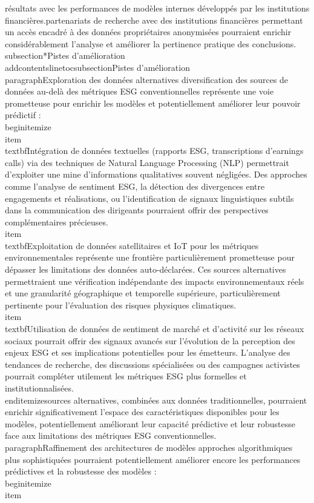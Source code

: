 résultats avec les performances de modèles internes développés par les institutions financières.\n\nDes partenariats de recherche avec des institutions financières permettant un accès encadré à des données propriétaires anonymisées pourraient enrichir considérablement l'analyse et améliorer la pertinence pratique des conclusions.\n\n\\subsection*{Pistes d'amélioration}\n\\addcontentsline{toc}{subsection}{Pistes d'amélioration}\n\n\\paragraph{Exploration des données alternatives} \n\nLa diversification des sources de données au-delà des métriques ESG conventionnelles représente une voie prometteuse pour enrichir les modèles et potentiellement améliorer leur pouvoir prédictif :\n\\begin{itemize}\n    \\item \\textbf{Intégration de données textuelles} (rapports ESG, transcriptions d'earnings calls) via des techniques de Natural Language Processing (NLP) permettrait d'exploiter une mine d'informations qualitatives souvent négligées. Des approches comme l'analyse de sentiment ESG, la détection des divergences entre engagements et réalisations, ou l'identification de signaux linguistiques subtils dans la communication des dirigeants pourraient offrir des perspectives complémentaires précieuses.\n    \n    \\item \\textbf{Exploitation de données satellitaires et IoT pour les métriques environnementales} représente une frontière particulièrement prometteuse pour dépasser les limitations des données auto-déclarées. Ces sources alternatives permettraient une vérification indépendante des impacts environnementaux réels et une granularité géographique et temporelle supérieure, particulièrement pertinente pour l'évaluation des risques physiques climatiques.\n    \n    \\item \\textbf{Utilisation de données de sentiment de marché et d'activité sur les réseaux sociaux} pourrait offrir des signaux avancés sur l'évolution de la perception des enjeux ESG et ses implications potentielles pour les émetteurs. L'analyse des tendances de recherche, des discussions spécialisées ou des campagnes activistes pourrait compléter utilement les métriques ESG plus formelles et institutionnalisées.\n\\end{itemize}\n\nCes sources alternatives, combinées aux données traditionnelles, pourraient enrichir significativement l'espace des caractéristiques disponibles pour les modèles, potentiellement améliorant leur capacité prédictive et leur robustesse face aux limitations des métriques ESG conventionnelles.\n\n\\paragraph{Raffinement des architectures de modèles} \n\nDes approches algorithmiques plus sophistiquées pourraient potentiellement améliorer encore les performances prédictives et la robustesse des modèles :\n\\begin{itemize}\n    \\item 